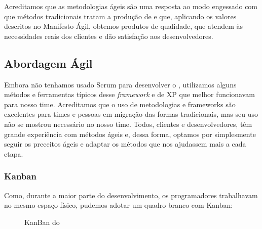 Acreditamos que as metodologias ágeis são uma resposta ao modo engessado com que métodos tradicionais tratam a produção de \software e que, aplicando os valores descritos no Manifesto Ágil, obtemos produtos de qualidade, que atendem às necessidades reais dos clientes e dão satisfação aos desenvolvedores.  

\subsection{Abordagem Ágil}

Embora não tenhamos usado Scrum para desenvolver o \calopsita, utilizamos alguns métodos e ferramentas típicos desse \textit{framework} e de XP que melhor funcionavam para nosso time. Acreditamos que o uso de metodologias e frameworks são excelentes para times e pessoas em migração das formas tradicionais, mas seu uso não se mostrou necessário no nosso time. Todos, clientes e desenvolvedores, têm grande experiência com métodos ágeis e, dessa forma, optamos por simplesmente seguir os preceitos ágeis e adaptar os métodos que nos ajudassem mais a cada etapa. 

\subsubsection*{Kanban}

Como, durante a maior parte do desenvolvimento, os programadores trabalhavam no mesmo espaço físico, pudemos adotar um quadro branco com Kanban:

\begin{figure}[H]
  \centering
  \caption{KanBan do \calopsita}
\end{figure}

